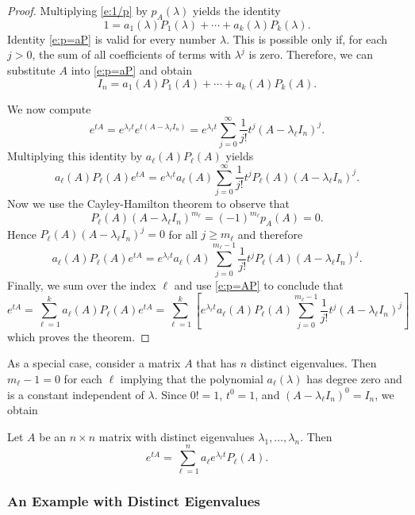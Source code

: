 \documentclass{ximera}
\begin{document}
\begin{proof} Multiplying \eqref{e:1/p} by $p_A(\lambda)$ yields the identity
\begin{equation}  \label{e:p=aP}
1 = a_1(\lambda)P_1(\lambda) + \cdots + a_k(\lambda)P_k(\lambda).
\end{equation}
Identity \eqref{e:p=aP} is valid for every number $\lambda$.  This is 
possible only if, for each $j>0$, the sum of all coefficients of terms 
with $\lambda^j$ is zero.  Therefore, we can substitute $A$ into 
\eqref{e:p=aP} and obtain
\begin{equation}  \label{e:p=AP}
I_n = a_1(A)P_1(A) + \cdots + a_k(A)P_k(A).
\end{equation}

We now compute 
\[
e^{tA}   =  e^{\lambda_\ell t}e^{t(A-\lambda_\ell I_n)} =  
e^{\lambda_\ell t}\sum_{j=0}^\infty\frac{1}{j!}t^j(A-\lambda_\ell I_n)^j.
\]
Multiplying this identity by $a_\ell(A)P_\ell(A)$ yields
\[
a_\ell(A)P_\ell(A)e^{tA} = e^{\lambda_\ell t}a_\ell(A)
\sum_{j=0}^\infty\frac{1}{j!}t^jP_\ell(A)(A-\lambda_\ell I_n)^j.
\]
Now we use the Cayley-Hamilton theorem to observe that 
\[
P_\ell(A)(A-\lambda_\ell I_n)^{m_\ell} = (-1)^{m_\ell}p_A(A) = 0.
\]
Hence $P_\ell(A)(A-\lambda_\ell I_n)^j=0$ for all $j\ge m_\ell$
and therefore
\[
a_\ell(A)P_\ell(A)e^{tA} = e^{\lambda_\ell t}a_\ell(A)
\sum_{j=0}^{m_\ell-1}\frac{1}{j!}t^jP_\ell(A)(A-\lambda_\ell I_n)^j.
\]
Finally, we sum over the index $\ell$ and use \eqref{e:p=AP} to conclude that
\[
e^{tA} = \sum_{\ell=1}^ka_\ell(A)P_\ell(A)e^{tA} = 
\sum_{\ell=1}^k\left[ e^{\lambda_\ell t}a_\ell(A)P_\ell(A)
\sum_{j=0}^{m_\ell-1}\frac{1}{j!}t^j(A-\lambda_\ell I_n)^j \right]
\]
which proves the theorem.  \end{proof}  

As a special case, consider a matrix $A$ that has $n$ distinct
eigenvalues. Then $m_\ell-1=0$ for each $\ell$ implying that the polynomial
$a_\ell(\lambda)$ has degree zero and is a constant independent of $\lambda$. 
Since $0!=1$, $t^0=1$, and $(A-\lambda_\ell I_n)^0=I_n$, we obtain
\begin{corollary} \label{T:etA0}
Let $A$ be an $n\times n$ matrix with distinct eigenvalues
$\lambda_1,\ldots,\lambda_n$. Then
\[
e^{tA} = \sum_{\ell=1}^n a_\ell e^{\lambda_\ell t} P_\ell(A).
\]
\end{corollary}

\subsubsection*{An Example with Distinct Eigenvalues}
\end{document}
